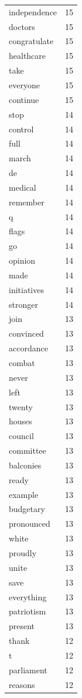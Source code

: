 \begin{tabular}{lr}
independence & 15 \\
doctors & 15 \\
congratulate & 15 \\
healthcare & 15 \\
take & 15 \\
everyone & 15 \\
continue & 15 \\
stop & 14 \\
control & 14 \\
full & 14 \\
march & 14 \\
de & 14 \\
medical & 14 \\
remember & 14 \\
q & 14 \\
flags & 14 \\
go & 14 \\
opinion & 14 \\
made & 14 \\
initiatives & 14 \\
stronger & 14 \\
join & 13 \\
convinced & 13 \\
accordance & 13 \\
combat & 13 \\
never & 13 \\
left & 13 \\
twenty & 13 \\
houses & 13 \\
council & 13 \\
committee & 13 \\
balconies & 13 \\
ready & 13 \\
example & 13 \\
budgetary & 13 \\
pronounced & 13 \\
white & 13 \\
proudly & 13 \\
unite & 13 \\
save & 13 \\
everything & 13 \\
patriotism & 13 \\
present & 13 \\
thank & 12 \\
t & 12 \\
parliament & 12 \\
reasons & 12 \\

\end{tabular}

